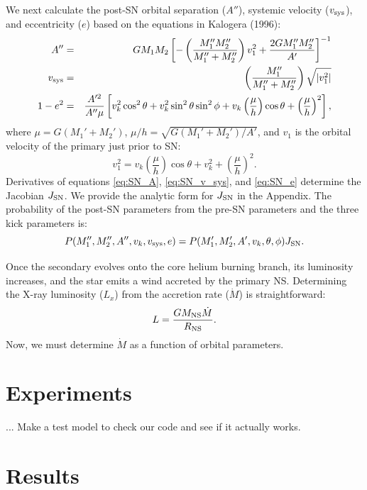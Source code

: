 \documentclass[12pt, preprint]{aastex}
\begin{document}
We next calculate the post-SN orbital separation ($A''$), systemic velocity ($v_{\rm sys}$), and eccentricity ($e$) based on the equations in Kalogera (1996):
\begin{eqnarray}
A'' &=& GM_1M_2 \left[ -\left( \frac{M_1''M_2''}{M_1'' + M_2''} \right) v_1^2 + \frac{2GM_1''M_2''}{A'} \right] ^{-1} \label{eq:SN_A} \\
v_{\rm sys} &=& \left( \frac{M_1''}{M_1'' + M_2''} \right) \sqrt{ |v_1^2| } \label{eq:SN_v_sys} \\
1-e^2 &=& \frac{A'^2}{A'' \mu} \left[ v_k^2 \cos^2\theta + v_k^2 \sin^2 \theta \sin^2 \phi + v_k \left( \frac{\mu}{h} \right) \cos \theta + \left( \frac{\mu}{h} \right)^2  \right], \label{eq:SN_e}
\end{eqnarray}
where $\mu = G(M_1' + M_2')$, $\mu/h = \sqrt{G(M_1'+M_2') / A'}$, and $v_1$ is the orbital velocity of the primary just prior to SN:
\begin{equation}
v_1^2 = v_k \left( \frac{\mu}{h} \right) \cos \theta + v_k^2 + \left( \frac{\mu}{h} \right)^2. 
\end{equation}
Derivatives of equations \ref{eq:SN_A}, \ref{eq:SN_v_sys}, and \ref{eq:SN_e} determine the Jacobian $J_{\rm SN}$. We provide the analytic form for $J_{\rm SN}$ in the Appendix. The probability of the post-SN parameters from the pre-SN parameters and the three kick parameters is:
\begin{equation}
P(M_1'', M_2'', A'', v_k, v_{\rm sys}, e) = P(M_1', M_2', A', v_k, \theta, \phi) J_{\rm SN}.
\end{equation}


Once the secondary evolves onto the core helium burning branch, its luminosity increases, and the star emits a wind accreted by the primary NS. Determining the X-ray luminosity ($L_x$) from the accretion rate ($\dot{M}$) is straightforward: 
\begin{equation}
L = \frac{G M_{\rm NS} \dot{M}}{R_{\rm NS}}.
\end{equation}
Now, we must determine $\dot{M}$ as a function of orbital parameters.




\section{Experiments}

... Make a test model to check our code and see if it actually works.

\section{Results}
\end{document}
